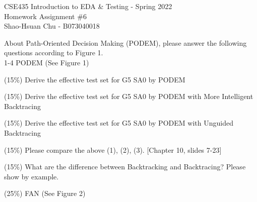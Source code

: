 \documentclass[12pt,answers]{exam}
\begin{document}
\begin{center}
\LARGE CSE435 Introduction to EDA \& Testing - Spring 2022 \\
\Large Homework Assignment \#6 \\
\Large Shao-Hsuan Chu - B073040018 \\
\end{center}
\bigskip

About Path-Oriented Decision Making (PODEM), please answer the following questions according to Figure 1. \\
1-4 PODEM (See Figure 1)
\begin{questions}
  \question (15\%) Derive the effective test set for G5 SA0 by PODEM
  
  \begin{solution}
  \end{solution}

  \question (15\%) Derive the effective test set for G5 SA0 by PODEM with More Intelligent Backtracing
  \begin{solution}
  \end{solution}

  \question (15\%) Derive the effective test set for G5 SA0 by PODEM with Unguided Backtracing
  \begin{solution}
  \end{solution}

  \question (15\%) Please compare the above (1), (2), (3). [Chapter 10, slides 7-23]
  \begin{solution}
  \end{solution}

  \question (15\%) What are the difference between Backtracking and Backtracing? Please show by example.
  \begin{solution}
  \end{solution}

  \question (25\%) FAN (See Figure 2)
  

\end{questions}
\end{document}
